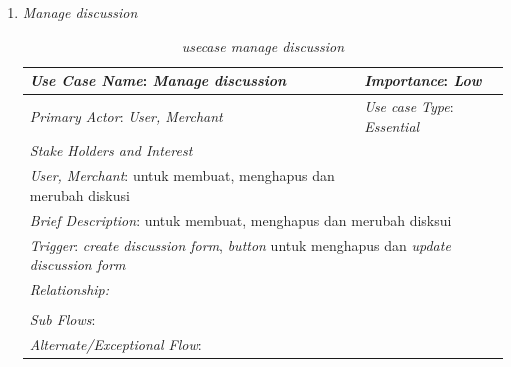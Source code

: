 \documentclass[a4paper]{article}
\begin{document}
\begin{enumerate}
\begin{enumerate}
        \newpage

        \item \textit{Manage discussion}
\begin{table}[h]
    \centering
    \begin{tabular}{|lll}
    \hline
    \multicolumn{1}{|l|}{\textit{Use Case Name}: \textit{Manage discussion}}             & \multicolumn{2}{l|}{\textit{Importance}: \textit{Low}}   \\ \hline
    \multicolumn{1}{|l|}{\textit{Primary Actor}: \textit{User, Merchant}}             & \multicolumn{2}{l|}{\textit{Use case Type}: \textit{Essential}} \\ \hline
    \multicolumn{1}{|l|}{\textit{Stake Holders and Interest}} &                               &                               \\ \cline{1-1}
    \multicolumn{1}{|l|}{\textit{User, Merchant}: untuk membuat, menghapus dan merubah diskusi}                                                     &                               &                               \\ \hline
    \multicolumn{3}{|l|}{\textit{Brief Description}: untuk membuat, menghapus dan merubah disksui}                                                                         \\ \hline
    \multicolumn{3}{|l|}{\textit{Trigger}: \textit{create discussion form}, \textit{button} untuk menghapus dan \textit{update discussion form}}                                                                                   \\ \hline
    \multicolumn{3}{|l|}{\textit{Relationship:}}                                                                              \\ \hline
    \multicolumn{3}{|l|}{}                                                                                                                     \\ \hline
    \multicolumn{3}{|l|}{\textit{Sub Flows}:}                                                                                 \\ \hline
    \multicolumn{3}{|l|}{\textit{Alternate/Exceptional Flow}:}                                                                \\ \hline
    \end{tabular}
    \caption{\textit{usecase manage discussion} }
\end{table}


\end{enumerate}
\end{enumerate}
\end{document}
